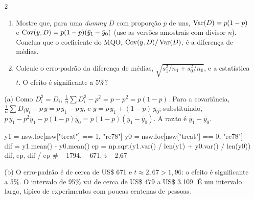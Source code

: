 \documentclass[lista]{tmlnotas}
\begin{document}
\begin{exercicio}{2}
\begin{enumerate}[label=(\alph*)]
  \item Mostre que, para uma \emph{dummy} $D$ com proporção $p$ de uns,
        $\operatorname{Var}(D) = p(1-p)$ e $\operatorname{Cov}(y, D) = p(1-p)(\bar y_1 - \bar y_0)$
        (use as versões amostrais com divisor $n$). Conclua que o coeficiente
        do MQO, $\operatorname{Cov}(y,D)/\operatorname{Var}(D)$, é a diferença de médias.
  \item Calcule o erro-padrão da diferença de médias,
        $\sqrt{s_1^2/n_1 + s_0^2/n_0}$, e a estatística $t$. O efeito é
        significante a 5\%?
\end{enumerate}
\end{exercicio}
\begin{solucao}
(a) Como $D_i^2 = D_i$, $\frac1n\sum D_i^2 - p^2 = p - p^2 = p(1-p)$. Para a
covariância, $\frac1n\sum D_i y_i - p\,\bar y = p\,\bar y_1 - p\,\bar y$, e
$\bar y = p\,\bar y_1 + (1-p)\,\bar y_0$; substituindo,
$p\,\bar y_1 - p^2\bar y_1 - p(1-p)\bar y_0 = p(1-p)(\bar y_1 - \bar y_0)$.
A razão é $\bar y_1 - \bar y_0$.
\begin{codigo}
y1 = nsw.loc[nsw["treat"] == 1, "re78"]
y0 = nsw.loc[nsw["treat"] == 0, "re78"]
dif = y1.mean() - y0.mean()
ep = np.sqrt(y1.var() / len(y1) + y0.var() / len(y0))
dif, ep, dif / ep              # ~ 1794, ~ 671, t ~ 2,67
\end{codigo}
(b) O erro-padrão é de cerca de US\$ 671 e $t \approx 2{,}67 > 1{,}96$: o efeito
é significante a 5\%. O intervalo de 95\% vai de cerca de US\$ 479 a US\$ 3.109.
É um intervalo largo, típico de experimentos com poucas centenas de pessoas.
\end{solucao}
\end{document}
